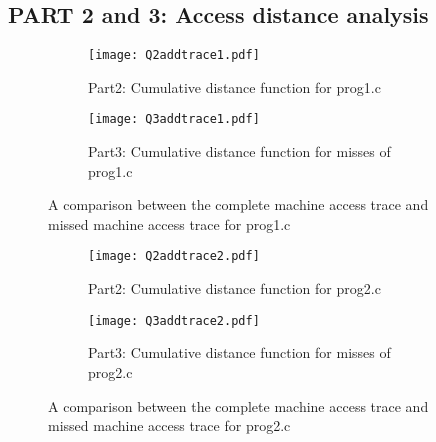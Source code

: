 \subsection*{PART 2 and 3: Access distance analysis}


\begin{figure}[H]
\centering
\begin{subfigure}{.48\textwidth}
  \centering
  \texttt{[image: Q2addtrace1.pdf]}
  \caption{Part2: Cumulative distance function for prog1.c}
  \label{fig:sub1}
\end{subfigure}%
\hspace{2mm}
\begin{subfigure}{.465\textwidth}
  \centering
  \texttt{[image: Q3addtrace1.pdf]}
  \caption{Part3: Cumulative distance function for misses of prog1.c}
  \label{fig:sub2}
\end{subfigure}
\caption{A comparison between the complete machine access trace and missed machine access trace for prog1.c}
\label{fig:test1}
\vspace{0.1in}
\begin{subfigure}{.48\textwidth}
  \centering
  \texttt{[image: Q2addtrace2.pdf]}
  \caption{Part2: Cumulative distance function for prog2.c}
  \label{fig:sub3}
\end{subfigure}%
\hspace{2mm}
\begin{subfigure}{.465\textwidth}
  \centering
  \texttt{[image: Q3addtrace2.pdf]}
  \caption{Part3: Cumulative distance function for misses of prog2.c}
  \label{fig:sub4}
\end{subfigure}
\caption{A comparison between the complete machine access trace and missed machine access trace for prog2.c}
\label{fig:test2}
\end{figure}


